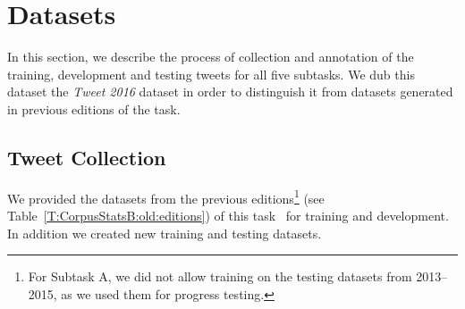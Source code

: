\documentclass[11pt,letterpaper]{article}
\begin{document}



\section{Datasets}
\label{sec:datasets}

\noindent In this section, we describe the process of collection and
annotation of the training, development and testing tweets for all
five subtasks. We dub this dataset the \emph{Tweet 2016} dataset in
order to distinguish it from datasets generated in previous editions
of the task.


\subsection{Tweet Collection}

We provided the datasets from the previous
editions\footnote{For Subtask A, we did not allow training on the
testing datasets from 2013--2015, as we used them for progress
testing.} (see Table~\ref{T:CorpusStatsB:old:editions}) of this
task~\cite{Nakov:2013ty,Rosenthal:2014ty,Rosenthal:2015ty,Nakov:2016rm}
for training and development. In addition we created new training and testing
datasets. 
\end{document}
